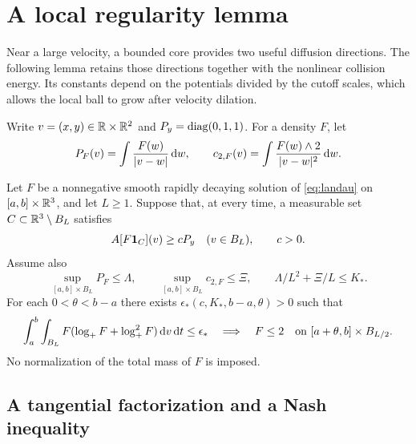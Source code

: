 \section{A local regularity lemma}\label{sec:local}

Near a large velocity, a bounded core provides two useful diffusion directions. The following lemma retains those directions together with the nonlinear collision energy. Its constants depend on the potentials divided by the cutoff scales, which allows the local ball to grow after velocity dilation.

Write $v=(x,y)\in\mathbb R\times\mathbb R^2$ and $P_y=\operatorname{diag}(0,1,1)$. For a density $F$, let
\[
 P_F(v)=\int\frac{F(w)}{|v-w|}\,\mathrm dw,\qquad
 c_{2,F}(v)=\int\frac{F(w)\wedge2}{|v-w|^2}\,\mathrm dw.
\]

\begin{proposition}\label{prop:local}
Let $F$ be a nonnegative smooth rapidly decaying solution of \eqref{eq:landau} on $[a,b]\times\mathbb R^3$, and let $L\ge1$. Suppose that, at every time, a measurable set $C\subset\mathbb R^3\setminus B_L$ satisfies
\begin{equation}\label{eq:core-local}
 A[F\mathbf 1_C](v)\ge cP_y\quad(v\in B_L),\qquad c>0.
\end{equation}
Assume also
\begin{equation}\label{eq:pot-local}
 \sup_{[a,b]\times B_L}P_F\le\Lambda,\qquad
 \sup_{[a,b]\times B_L}c_{2,F}\le\Xi,\qquad
 \Lambda/L^2+\Xi/L\le K_*.
\end{equation}
For each $0<\theta<b-a$ there exists $\epsilon_*(c,K_*,b-a,\theta)>0$ such that
\begin{equation}\label{eq:entropy-small}
 \int_a^b\int_{B_L}F(\log_+F+\log_+^2F)\,\mathrm dv\,\mathrm dt\le\epsilon_*
 \quad\Longrightarrow\quad
 F\le2\quad\hbox{on }[a+\theta,b]\times B_{L/2}.
\end{equation}
No normalization of the total mass of $F$ is imposed.
\end{proposition}

\subsection{A tangential factorization and a Nash inequality}

